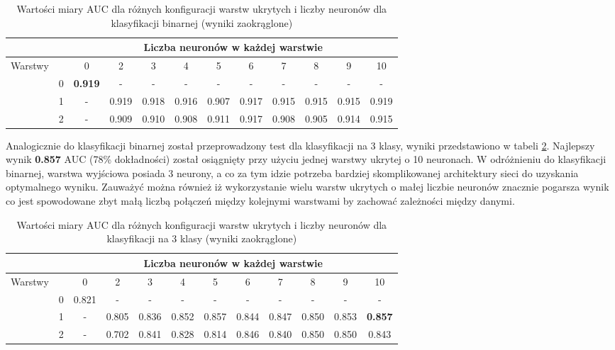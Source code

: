 \documentclass[a4paper, twoside, 11pt, openright]{article}
\begin{document}
\begin{table}[H]
    \centering
    \begin{tabular}{|c|c|c|c|c|c|c|c|c|c|c|c|}
        \hline
         & &  \multicolumn{10}{c|}{Liczba neuronów w każdej warstwie}  \\ \hline
        \multirow{4}{*}{Warstwy} & & 0 & 2 & 3 & 4 & 5 & 6 & 7 & 8 & 9 & 10  \\ \cline{2 - 12}
			& 0 & \textbf{0.919} & - & - & - & - & - & - & - & - & - \\ \cline{2 - 12} 
			& 1 & - &  0.919 &  0.918 &  0.916 &  0.907 &  0.917 &  0.915 &  0.915 &  0.915  & 0.919 \\ \cline{2 - 12} 
			& 2 & - & 0.909 &    0.910 &   0.908 &   0.911 &   0.917 &   0.908 &   0.905 &   0.914 & 0.915 \\ \cline{2 - 12} \hline

    \end{tabular}
    \caption{Wartości miary AUC dla różnych konfiguracji warstw ukrytych i liczby neuronów dla klasyfikacji binarnej (wyniki zaokrąglone)}
    \label{tab:nn_layers_binary}
\end{table}

Analogicznie do klasyfikacji binarnej został przeprowadzony test dla klasyfikacji na 3 klasy, wyniki przedstawiono w tabeli \ref{tab:nn_layers_discrete}. Najlepszy wynik \textbf{0.857} AUC (78\% dokładności) został osiągnięty przy użyciu jednej warstwy ukrytej o 10 neuronach. W odróżnieniu do klasyfikacji binarnej, warstwa wyjściowa posiada 3 neurony, a co za tym idzie potrzeba bardziej skomplikowanej architektury sieci do uzyskania optymalnego wyniku. Zauważyć można również iż wykorzystanie wielu warstw ukrytych o małej liczbie neuronów znacznie pogarsza wynik co jest spowodowane zbyt małą liczbą połączeń między kolejnymi warstwami by zachować zależności między danymi.

\begin{table}[H]
    \centering
    \begin{tabular}{|c|c|c|c|c|c|c|c|c|c|c|c|}
        \hline
         & &  \multicolumn{10}{c|}{Liczba neuronów w każdej warstwie}  \\ \hline
        \multirow{4}{*}{Warstwy} & & 0 & 2 & 3 & 4 & 5 & 6 & 7 & 8 & 9 & 10  \\ \cline{2 - 12}
			& 0 & 0.821 & - & - & - & - & - & - & - & - & - \\ \cline{2 - 12} 
			& 1 & - &  0.805 &  0.836 &  0.852 &  0.857 &  0.844 &  0.847 &  0.850 &  0.853 & \textbf{0.857} \\ \cline{2 - 12} 
			& 2 & - & 0.702 &   0.841 &   0.828 &   0.814 &   0.846 &    0.840 &   0.850 &    0.850 &   0.843  \\ \cline{2 - 12} \hline

    \end{tabular}
    \caption{Wartości miary AUC dla różnych konfiguracji warstw ukrytych i liczby neuronów dla klasyfikacji na 3 klasy (wyniki zaokrąglone)}
    \label{tab:nn_layers_discrete}
\end{table}
\end{document}
